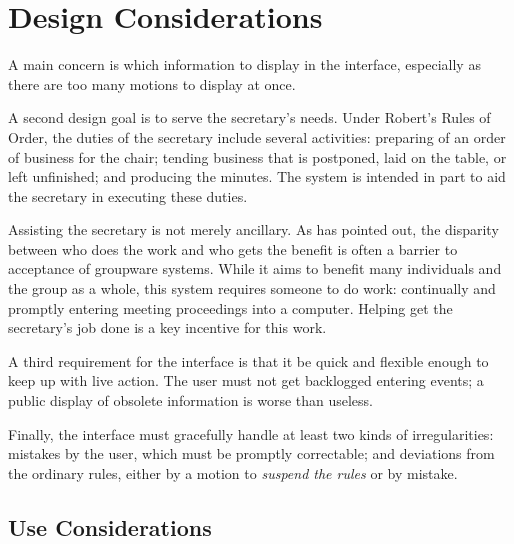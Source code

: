 \documentclass{book}
\begin{document}
\section{Design Considerations}  %

A main concern is which information to display in the interface, especially as there are too many motions to display at once.

\label{sec:secretary} A second design goal is to serve the secretary's needs. Under Robert's Rules of Order, the duties of the secretary include several activities: preparing of an order of business for the chair; tending business that is postponed, laid on the table, or left unfinished; and producing the minutes. The system is intended in part to aid the secretary in executing these duties.

Assisting the secretary is not merely ancillary. As \citealt{grudin:groupware} has pointed out, the disparity between who does the work and who gets the benefit is often a barrier to acceptance of groupware systems. While it aims to benefit many individuals and the group as a whole, this system requires someone to do work: continually and promptly entering meeting proceedings into a computer. Helping get the secretary's job done is a key incentive for this work.

\label{sec:live-setting}

A third requirement for the interface is that it be quick and flexible enough to keep up with live action. The user must not get backlogged entering events; a public display of obsolete information is worse than useless.

Finally, the interface must gracefully handle at least two kinds of irregularities: mistakes by the user, which must be promptly correctable; and deviations from the ordinary rules, either by a motion to \emph{suspend the rules} or by mistake.




\subsection{Use Considerations}  %
\label{sec:caveats}



\end{document}
